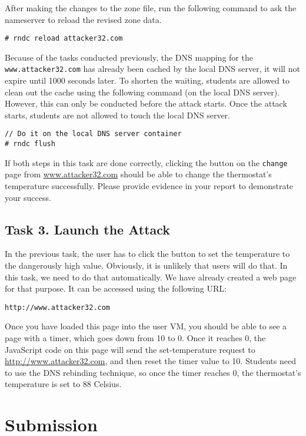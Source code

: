 After making the changes to the zone file, 
run the following command to ask the nameserver 
to reload the revised zone data. 

\begin{lstlisting}
# rndc reload attacker32.com
\end{lstlisting}



Because of the tasks conducted previously, the DNS mapping for the 
\texttt{www.attacker32.com} has already been cached by the local
DNS server, it will not expire until 1000 seconds later.  To 
shorten the waiting, students are allowed to clean out the cache using the 
following command (on the local DNS server). However, this can only be 
conducted before the attack starts. Once the attack starts, students 
are not allowed to touch the local DNS server. 

\begin{lstlisting}
// Do it on the local DNS server container
# rndc flush
\end{lstlisting}
 
 
If both steps in this task are done correctly, clicking the button 
on the \texttt{change} page from \url{www.attacker32.com} should be able to change
the thermostat's temperature successfully. Please provide evidence in your report to
demonstrate your success.


\subsection{Task 3. Launch the Attack}

In the previous task, the user has to click the button to set the 
temperature to the dangerously high value. Obviously, it is unlikely that users will 
do that.  In this task, we need to do that automatically. We have already created 
a web page for that purpose. It can be accessed using the following URL:


\begin{lstlisting}
http://www.attacker32.com
\end{lstlisting}
 

Once you have loaded this page into the user VM, you should be able to see a page with a 
timer, which goes down from 10 to 0. Once it reaches 0, the JavaScript code 
on this page will send the set-temperature request to 
\url{http://www.attacker32.com}, and then reset the timer value to 10. 
Students need to use the DNS rebinding technique, so
once the timer reaches 0, the thermostat's temperature is set to 
88 Celsius. 



\section{Submission}






